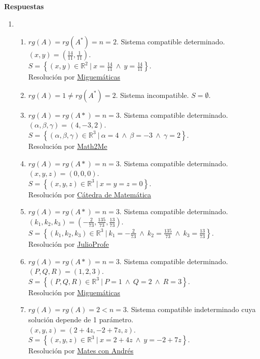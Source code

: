 \documentclass[a4paper]{article}
\newcommand{\exercise}{\item}
\begin{document}
 \textbf{Respuestas}\begin{enumerate}\exercise\begin{enumerate} [label=(\alph*)]		\item $rg(A)=rg(A^*)=n=2$. Sistema compatible determinado. \\ $(x,y)=\left(\frac{14}{11},\frac{1}{11}\right)$. \\ $S=\left\{(x,y)\in \mathbb{R}^2 ~|~ x=\frac{14}{11} ~\land~ y=\frac{14}{11}\right\}$. \\ Resolución por \href{https://youtu.be/OE8e70VO_CE}{Miguemáticas}
		\item $rg(A) = 1 \neq rg(A^*) =2$. Sistema incompatible. $S=\emptyset$. 
		\item $rg(A)=rg(A*)=n=3$. Sistema compatible determinado. \\ $(\alpha,\beta,\gamma)=(4,-3,2)$. \\ $S=\left\{(\alpha,\beta,\gamma)\in \mathbb{R}^3 ~|~ \alpha=4 ~\land~ \beta=-3 ~\land~ \gamma=2 \right\}$. \\ Resolución por \href{https://youtu.be/ZtMdsFXiFYQ}{Math2Me}
		\item $rg(A)=rg(A*)=n=3$. Sistema compatible determinado. \\ $(x,y,z)=(0,0,0)$. \\ $S=\left\{(x,y,z)\in \mathbb{R}^3 ~|~ x=y=z=0 \right\}$. \\ Resolución por \href{https://youtu.be/5tOyCI7YIwk?t=21}{Cátedra de Matemática}
		\item $rg(A)=rg(A*)=n=3$. Sistema compatible determinado. \\ $(k_1,k_2,k_3)=\left(-\frac{2}{73},\frac{135}{73},\frac{13}{73}\right)$. \\ $S=\left\{(k_1,k_2,k_3)\in \mathbb{R}^3 ~|~ k_1=-\frac{2}{73} ~\land~ k_2=\frac{135}{73} ~\land~ k_3=\frac{13}{73} \right\}$. \\ Resolución por \href{https://youtu.be/SxT5Sbn8odE}{JulioProfe}
		\item  $rg(A)=rg(A*)=n=3$. Sistema compatible determinado. \\ $(P,Q,R)=(1,2,3)$. \\ $S=\left\{(P,Q,R)\in \mathbb{R}^3 ~|~ P=1 ~\land~ Q=2 ~\land~ R=3 \right\}$. \\ Resolución por \href{https://youtu.be/kpRQ_jWHSqg?t=95}{Miguemáticas}
		\item  $rg(A)=rg(A)=2<n=3$. Sistema compatible indeterminado cuya solución depende de 1 parámetro. \\ $(x,y,z)=(2+4z,-2+7z,z)$. \\ $S=\left\{(x,y,z)\in \mathbb{R}^3 ~|~ x=2+4z ~\land~ y=-2+7z \right\}$. \\ Resolución por \href{https://youtu.be/ERUAPI-jrH0}{Mates con Andrés}

\end{enumerate}
\end{enumerate}
\end{document}
